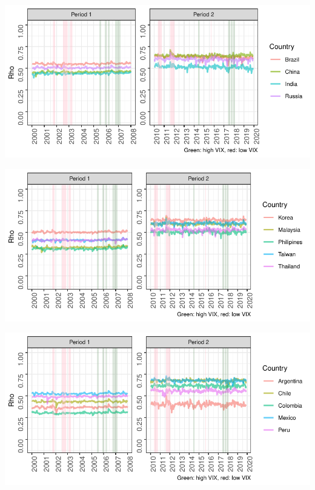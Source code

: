 \documentclass[11pt,preprint, authoryear]{elsarticle}
\let\origfigure\figure
\let\endorigfigure\endfigure
\renewenvironment{figure}[1][2] {
    \expandafter\origfigure\expandafter[H]
} {
    \endorigfigure
}
\numberwithin{equation}{section}
\numberwithin{figure}{section}
\numberwithin{table}{section}
\begin{document}
\begin{figure}[H]

{\centering \includegraphics{Template_files/figure-latex/dcc6-1} 

}

\caption{South Africa-BRICS DCC\label{dcc6}}\label{fig:dcc6}
\end{figure}
\begin{figure}[H]

{\centering \includegraphics{Template_files/figure-latex/dcc7-1} 

}

\caption{South Africa-Asia DCC \label{dcc7}}\label{fig:dcc7}
\end{figure}
\begin{figure}[H]

{\centering \includegraphics{Template_files/figure-latex/dcc8-1} 

}

\caption{South Africa-Latin America DCC \label{dcc8}}\label{fig:dcc8}
\end{figure}
\end{document}
